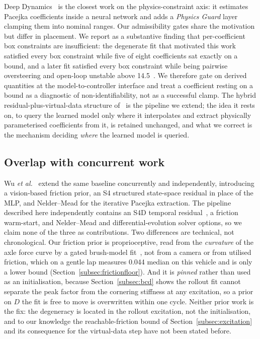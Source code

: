 \documentclass[lineno,12pt]{sn-jnl}
\makeatletter
\newif\ifsiu@prev
\DeclareRobustCommand{\siu@sep}{\ifsiu@prev\,\fi}
\DeclareRobustCommand{\siu@unit}[1]{\siu@sep\text{#1}\siu@prevtrue}
\DeclareRobustCommand{\siu@pre}[1]{\siu@sep\text{#1}\siu@prevfalse}
\DeclareRobustCommand{\siu@div}[1]{\text{#1}\siu@prevfalse}
\DeclareRobustCommand{\meter}{m}
\DeclareRobustCommand{\second}{s}
\DeclareRobustCommand{\gram}{g}
\DeclareRobustCommand{\newton}{N}
\DeclareRobustCommand{\radian}{rad}
\DeclareRobustCommand{\hertz}{Hz}
\DeclareRobustCommand{\percent}{\%}
\DeclareRobustCommand{\g}{\textit{g}}
\DeclareRobustCommand{\kilo}{k}
\DeclareRobustCommand{\milli}{m}
\DeclareRobustCommand{\per}{/}
\DeclareRobustCommand{\squared}{\ensuremath{^{2}}}
\providecommand{\degree}{\ensuremath{^{\circ}}}
\DeclareRobustCommand{\si}[1]{\begingroup
  \siu@prevfalse
  \renewcommand{\meter}{\siu@unit{m}}%
  \renewcommand{\second}{\siu@unit{s}}%
  \renewcommand{\gram}{\siu@unit{g}}%
  \renewcommand{\newton}{\siu@unit{N}}%
  \renewcommand{\radian}{\siu@unit{rad}}%
  \renewcommand{\hertz}{\siu@unit{Hz}}%
  \renewcommand{\percent}{\siu@unit{\%}}%
  \renewcommand{\degree}{\siu@unit{\ensuremath{^{\circ}}}}%
  \renewcommand{\g}{\siu@unit{\textit{g}}}%
  \renewcommand{\kilo}{\siu@pre{k}}%
  \renewcommand{\milli}{\siu@pre{m}}%
  \renewcommand{\per}{\siu@div{/}}%
  \renewcommand{\squared}{\ensuremath{^{2}}}%
  #1\endgroup}
\DeclareRobustCommand{\num}[1]{#1}
\DeclareRobustCommand{\SI}[2]{#1\,\si{#2}}
\theoremstyle{thmstyleone}%
\theoremstyle{thmstyletwo}%
\theoremstyle{thmstylethree}%
\makeatother
\begin{document}
Deep Dynamics~\cite{deepdynamics2024} is the closest work on the
physics-constraint axis: it estimates Pacejka coefficients inside a neural
network and adds a \emph{Physics Guard} layer clamping them into nominal ranges.
Our admissibility gates share the motivation but differ in placement. We report
as a substantive finding that per-coefficient box constraints are
insufficient: the degenerate fit that motivated this work satisfied every
box constraint while five of eight coefficients sat exactly on a bound, and a
later fit satisfied every box constraint while being pairwise oversteering and
open-loop unstable above \SI{14.5}{\meter\per\second}. We therefore gate on
derived quantities at the model-to-controller interface and treat a coefficient
resting on a bound as a diagnostic of non-identifiability, not as a
successful clamp. The hybrid residual-plus-virtual-data structure
of~\cite{ontrack2025} is the pipeline we extend; the idea it rests on, to query
the learned model only where it interpolates and extract physically
parameterised coefficients from it, is retained unchanged, and what we correct
is the mechanism deciding \emph{where} the learned model is queried.

\subsection{Overlap with concurrent work}

Wu \emph{et al.}~\cite{visionsysid2026} extend the same baseline concurrently
and independently, introducing a vision-based friction prior, an S4 structured
state-space residual in place of the MLP, and Nelder--Mead for the iterative
Pacejka extraction. The pipeline described here independently contains an S4D
temporal residual~\cite{gu2022s4d,gu2022s4}, a friction warm-start, and
Nelder--Mead and differential-evolution solver options, so we claim none of the
three as contributions. Two differences are technical, not
chronological. Our friction prior is proprioceptive, read from the
\emph{curvature} of the axle force curve by a gated brush-model
fit~\cite{fiala1954,acosta2017friction}, not from a camera or from
utilised friction, which on a gentle lap measures \num{0.044} median on this
vehicle and is only a lower bound (Section~\ref{subsec:frictionfloor}). And it
is \emph{pinned} rather than used as an initialisation, because
Section~\ref{subsec:bcd} shows the rollout fit cannot separate the peak factor
from the cornering stiffness at any excitation, so a prior on $D$ the fit is
free to move is overwritten within one cycle. Neither prior work is the fix:
the degeneracy is located in the rollout excitation, not the initialisation,
and to our knowledge the reachable-friction bound of
Section~\ref{subsec:excitation} and its consequence for the virtual-data step
have not been stated before.
\end{document}
